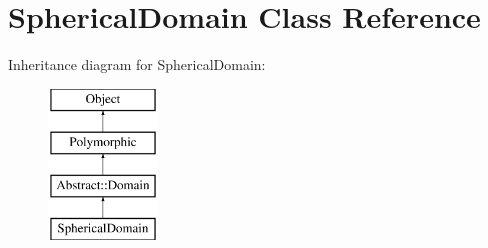 \hypertarget{classSphericalDomain}{}\section{Spherical\+Domain Class Reference}
\label{classSphericalDomain}
Inheritance diagram for Spherical\+Domain\+:\begin{figure}[H]
\begin{center}
\leavevmode
\includegraphics[height=4.000000cm]{classSphericalDomain}
\end{center}
\end{figure}
